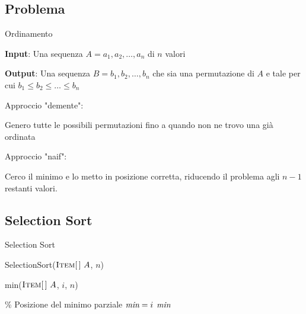 \subsection{Problema}

\begin{frame}{Ordinamento}

\vspace{-9pt}
\begin{myboxtitle}
\BI
\item \textbf{Input}: Una sequenza $A= a_1, a_2, \ldots, a_n$ di $n$ valori
\item \textbf{Output}: Una sequenza $B= b_1, b_2, \ldots, b_n$ che sia una permutazione di $A$ e tale per cui $b_1 \leq b_2 \leq \ldots \leq b_n$ 
\EI
\end{myboxtitle}

\bigskip
Approccio "demente":
\BI
\item Genero tutte le possibili permutazioni fino a quando non ne trovo una già ordinata
\EI

\bigskip\pause
Approccio "naif":
\BI
\item Cerco il minimo e lo metto in posizione corretta, riducendo il problema agli $n-1$ restanti valori.
\EI

\end{frame}

\subsection{Selection Sort}

\begin{frame}{Selection Sort}

\vspace{-6pt}
\begin{Procedure}
\caption[A]{\textsf{SelectionSort}($\textsc{Item}[\,]\ A$, \INTEGER $n$)}
\end{Procedure}

\vspace{-12pt}
\begin{Procedure}
\caption[A]{\INTEGER \textsf{min}($\textsc{Item}[\,]\ A$, \INTEGER $i$, \INTEGER $n$)}{
  \% Posizione del minimo parziale\;
  \INTEGER $\textit{min} = i$\;
  {
  }
  \Return $\textit{min}$
}
\end{Procedure}
\end{frame}



